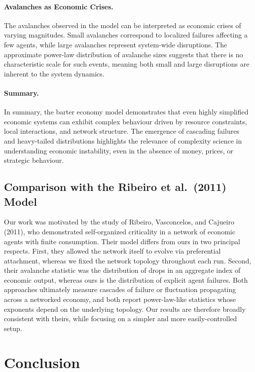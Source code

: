 \documentclass[11pt,a4paper]{article}
\begin{document}
\paragraph{Avalanches as Economic Crises.}
The avalanches observed in the model can be interpreted as economic
crises of varying magnitudes. Small avalanches correspond to localized
failures affecting a few agents, while large avalanches represent
system-wide disruptions. The approximate power-law distribution of
avalanche sizes suggests that there is no characteristic scale for such
events, meaning both small and large disruptions are inherent to the
system dynamics.

\paragraph{Summary.}
In summary, the barter economy model demonstrates that even highly
simplified economic systems can exhibit complex behaviour driven by
resource constraints, local interactions, and network structure. The
emergence of cascading failures and heavy-tailed distributions highlights
the relevance of complexity science in understanding economic
instability, even in the absence of money, prices, or strategic
behaviour.

\subsection{Comparison with the Ribeiro et al.\ (2011) Model}

Our work was motivated by the study of Ribeiro, Vasconcelos, and Cajueiro
(2011), who demonstrated self-organized criticality in a network of
economic agents with finite consumption. Their model differs from ours in
two principal respects. First, they allowed the network itself to evolve
via preferential attachment, whereas we fixed the network topology
throughout each run. Second, their avalanche statistic was the
distribution of drops in an aggregate index of economic output, whereas
ours is the distribution of explicit agent failures. Both approaches
ultimately measure cascades of failure or fluctuation propagating across
a networked economy, and both report power-law-like statistics whose
exponents depend on the underlying topology. Our results are therefore
broadly consistent with theirs, while focusing on a simpler and more
easily-controlled setup.

\section{Conclusion}
\end{document}
